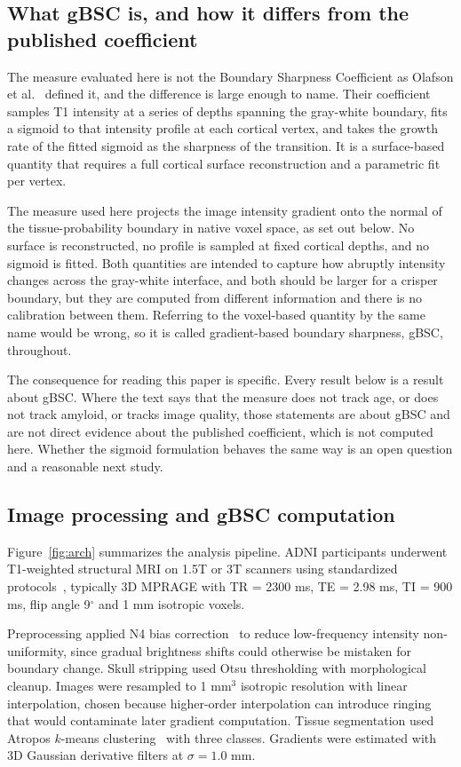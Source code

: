 \documentclass[blue]{ludusofficial}  %
\begin{document}
\subsection{What gBSC is, and how it differs from the published coefficient}

The measure evaluated here is not the Boundary Sharpness Coefficient as Olafson et al.~\cite{olafson2021bsc} defined it, and the difference is large enough to name. Their coefficient samples T1 intensity at a series of depths spanning the gray-white boundary, fits a sigmoid to that intensity profile at each cortical vertex, and takes the growth rate of the fitted sigmoid as the sharpness of the transition. It is a surface-based quantity that requires a full cortical surface reconstruction and a parametric fit per vertex.

The measure used here projects the image intensity gradient onto the normal of the tissue-probability boundary in native voxel space, as set out below. No surface is reconstructed, no profile is sampled at fixed cortical depths, and no sigmoid is fitted. Both quantities are intended to capture how abruptly intensity changes across the gray-white interface, and both should be larger for a crisper boundary, but they are computed from different information and there is no calibration between them. Referring to the voxel-based quantity by the same name would be wrong, so it is called gradient-based boundary sharpness, gBSC, throughout.

The consequence for reading this paper is specific. Every result below is a result about gBSC. Where the text says that the measure does not track age, or does not track amyloid, or tracks image quality, those statements are about gBSC and are not direct evidence about the published coefficient, which is not computed here. Whether the sigmoid formulation behaves the same way is an open question and a reasonable next study.

\subsection{Image processing and gBSC computation}

Figure~\ref{fig:arch} summarizes the analysis pipeline. ADNI participants underwent T1-weighted structural MRI on 1.5T or 3T scanners using standardized protocols~\cite{jack2008adni_mri}, typically 3D MPRAGE with TR = 2300 ms, TE = 2.98 ms, TI = 900 ms, flip angle 9$^\circ$ and 1 mm isotropic voxels.

Preprocessing applied N4 bias correction~\cite{tustison2010n4} to reduce low-frequency intensity non-uniformity, since gradual brightness shifts could otherwise be mistaken for boundary change. Skull stripping used Otsu thresholding with morphological cleanup. Images were resampled to 1 mm$^3$ isotropic resolution with linear interpolation, chosen because higher-order interpolation can introduce ringing that would contaminate later gradient computation. Tissue segmentation used Atropos $k$-means clustering~\cite{avants2011atropos} with three classes. Gradients were estimated with 3D Gaussian derivative filters at $\sigma = 1.0$ mm.
\end{document}
